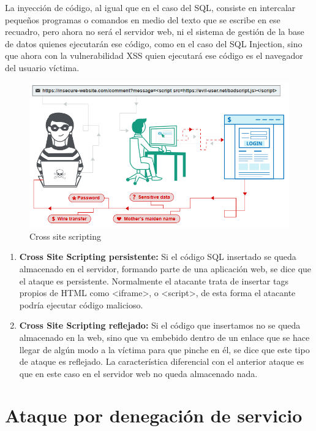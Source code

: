 La inyección de código, al igual que en el caso del SQL, consiste en intercalar pequeños programas o comandos en medio del texto que se escribe en ese recuadro, 
pero ahora no será el servidor web, ni el sistema de gestión de la base de datos quienes ejecutarán ese código, como en el caso del SQL Injection, sino que ahora 
con la vulnerabilidad XSS quien ejecutará ese código es el navegador del usuario víctima.

\begin{figure}[tphb]
  		   \centering
     		   \includegraphics[width=5in]{xss.png}
  		   \caption{Cross site scripting \cite{xss}}
  		   \label{img:xss}
\end{figure}

\begin{enumerate}
\item {\bfseries Cross Site Scripting persistente:}
Si el código SQL insertado se queda almacenado en el servidor, formando parte de una aplicación web, se dice que el ataque es persistente. Normalmente el atacante
trata de insertar tags propios de HTML como <iframe>, o <script>, de esta forma el atacante podría ejecutar código malicioso.

\item {\bfseries Cross Site Scripting reflejado:}
Si el código que insertamos no se queda almacenado en la web, sino que va embebido dentro de un enlace que se hace llegar de algún modo a la víctima para que 
pinche en él, se dice que este tipo de ataque es reflejado. La característica diferencial con el anterior ataque es que en este caso en el servidor web no queda almacenado nada.

\end{enumerate}

\section{Ataque por denegación de servicio}
\label{sec:denegacion-servicio}

